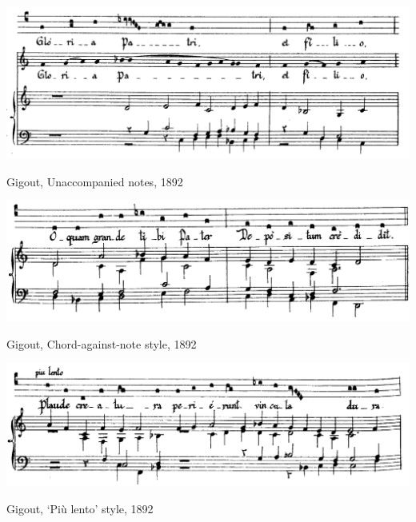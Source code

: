 \vspace*{\fill}

\clearpage

\vspace*{\fill}

\begin{example}
  \centering
  \includegraphics[width=\linewidth]{c/3/ex/gigout_1_5.jpg}
  \caption{Gigout, Unaccompanied notes, 1892}
  \label{mus:gigout_1_5}
\end{example}

\vspace*{\fill}

\begin{example}
  \centering
  \includegraphics[width=\linewidth]{c/3/ex/gigout_2_7.jpg}
  \caption{Gigout, Chord-against-note style, 1892}
  \label{mus:gigout_2_7}
\end{example}

\vspace*{\fill}

\clearpage

\vspace*{\fill}

\begin{example}
  \centering
  \includegraphics[width=\linewidth]{c/3/ex/gigout_4_20.png}
  \caption{Gigout, `Più lento' style, 1892}
  \label{mus:gigout_4_20}
\end{example}

